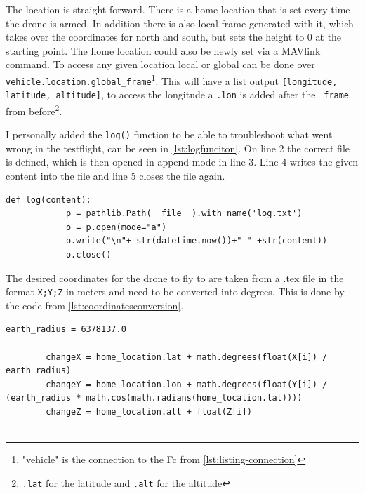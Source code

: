 \documentclass[svgnames]{article}
\begin{document}
	The location is straight-forward. There is a home location that is set every time the drone is armed. In addition there is also local frame generated with it, which takes over the coordinates for north and south, but sets the height to 0 at the starting point. The home location could also be newly set via a MAVlink command. To access any given location local or global can be done over \lstinline|vehicle.location.global_frame|\footnote{"vehicle" is the connection to the \gls{Fc} from \cref{lst:listing-connection}}. This will have a list output \lstinline|[longitude, latitude, altitude]|, to access the longitude a \lstinline|.lon| is added after the \lstinline|_frame| from before\footnote{\lstinline|.lat| for the latitude and \lstinline|.alt| for the altitude}.
	
	I personally added the \lstinline|log()| function to be able to troubleshoot what went wrong in the testflight, can be seen in \cref{lst:logfunciton}. On line 2 the correct file is defined, which is then opened in append mode in line 3. Line 4 writes the given content into the file and line 5 closes the file again.
	
	\begin{lstlisting}[style=myPython, caption={log function}, label=lst:logfunciton]
		def log(content):
			p = pathlib.Path(__file__).with_name('log.txt')
			o = p.open(mode="a")
			o.write("\n"+ str(datetime.now())+"	" +str(content))
			o.close()
	\end{lstlisting}
	
	The desired coordinates for the drone to fly to are taken from a .tex file in the format \lstinline|X;Y;Z| in meters and need to be converted into degrees. This is done by the code from \cref{lst:coordinatesconversion}.
	
	\begin{lstlisting}[style=myPython, caption= coordinate conversion, label=lst:coordinatesconversion]
		earth_radius = 6378137.0
		
		changeX = home_location.lat + math.degrees(float(X[i]) / earth_radius)
		changeY = home_location.lon + math.degrees(float(Y[i]) / (earth_radius * math.cos(math.radians(home_location.lat))))
		changeZ = home_location.alt + float(Z[i])
		
	\end{lstlisting}
	
\end{document}
